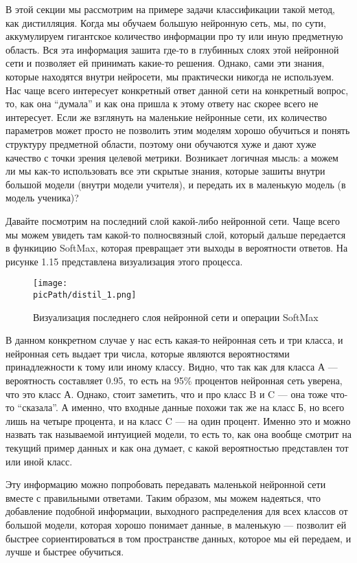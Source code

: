 \documentclass[oneside,final,12pt]{extreport}
\newcommand{\picPath}{images}
\begin{document}
В этой секции мы рассмотрим на примере задачи классификации такой метод, как дистилляция. Когда мы обучаем большую нейронную сеть, мы, по сути,  аккумулируем гигантское количество информации про ту или иную предметную область. Вся эта информация зашита где-то в глубинных слоях этой нейронной сети и позволяет ей принимать какие-то решения. Однако, сами эти знания, которые находятся внутри нейросети, мы практически никогда не используем. Нас чаще всего интересует конкретный ответ данной сети на конкретный вопрос, то, как она “думала” и как она пришла к этому ответу нас скорее всего не интересует. Если же взглянуть на маленькие нейронные сети, их количество параметров может просто не позволить этим моделям хорошо обучиться и понять структуру предметной области, поэтому они обучаются хуже и дают хуже качество с точки зрения целевой метрики. Возникает логичная мысль: а можем ли мы как-то использовать все эти скрытые знания, которые зашиты внутри большой модели (внутри модели учителя), и передать их в маленькую модель (в модель ученика)? 

Давайте посмотрим на последний слой какой-либо нейронной сети. Чаще всего мы можем увидеть там какой-то полносвязный слой, который дальше передается в функицию SoftMax, которая превращает эти выходы в вероятности ответов. На рисунке 1.15 представлена визуализация этого процесса.
\begin{figure}[H]
\begin{center}
  \texttt{[image: \\picPath/distil\_1.png]}
  \caption{Визуализация последнего слоя нейронной сети и операции SoftMax}
  \label{fig:distil_1}
  \end{center}
\end{figure}

В данном конкретном случае у нас есть какая-то нейронная сеть и три класса, и нейронная сеть выдает три числа, которые являются вероятностями принадлежности к тому или иному классу. Видно, что так как для класса А — вероятность составляет 0.95, то есть на 95\% процентов нейронная сеть уверена, что это класс А. 
Однако, стоит заметить, что и про класс B и C — она тоже что-то “сказала”. А именно, что входные данные похожи так же на класс Б, но всего лишь на четыре процента, и на класс C — на один процент. Именно это и можно назвать так называемой интуицией модели, то есть то, как она вообще смотрит на текущий пример данных и как она думает, с какой вероятностью представлен тот или иной класс. 

Эту информацию можно попробовать передавать маленькой нейронной сети вместе с правильными ответами. Таким образом, мы можем надеяться, что добавление подобной информации, выходного распределения для всех классов от большой модели, которая хорошо понимает данные, в маленькую — позволит ей быстрее сориентироваться в том пространстве данных, которое мы ей передаем, и лучше и быстрее обучиться. 
\end{document}
